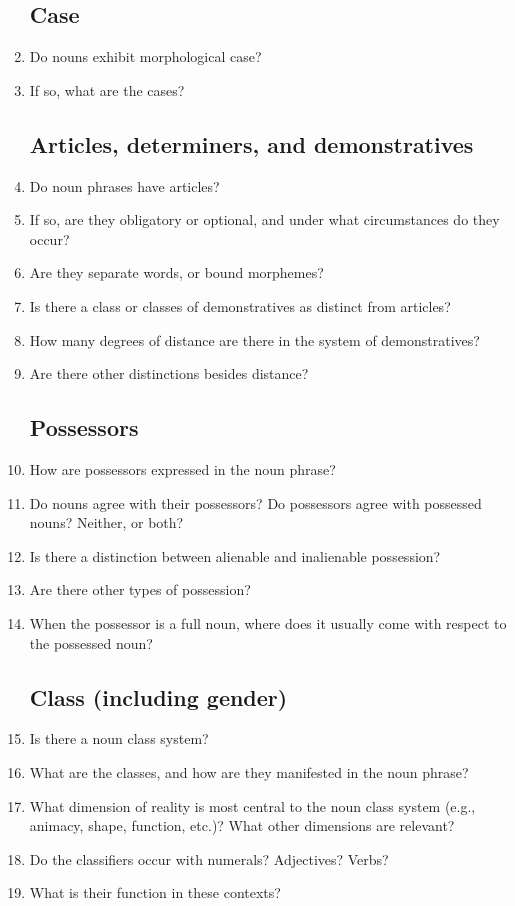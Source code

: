 \documentclass[twocolumn]{scrartcl}
\begin{document}
\begin{enumerate}[resume]
 \subsection{Case}
 \item Do nouns exhibit morphological case?
 \item If so, what are the cases? 
 \subsection{Articles, determiners, and demonstratives}
 \item Do noun phrases have articles?
 \item If so, are they obligatory or optional, and under what circumstances do they occur?
 \item Are they separate words, or bound morphemes?
 \item Is there a class or classes of demonstratives as distinct from articles?
 \item How many degrees of distance are there in the system of demonstratives?
 \item Are there other distinctions besides distance?
 \subsection{Possessors}
\item How are possessors expressed in the noun phrase?
\item Do nouns agree with their possessors?  Do possessors agree with possessed nouns? Neither, or both?
\item Is there a distinction between alienable and inalienable possession?
\item Are there other types of possession?
\item When the possessor is a full noun, where does it usually come with respect to the possessed noun?
\subsection{Class (including gender)}
\item Is there a noun class system?
\item What are the classes, and how are they manifested in the noun phrase?
\item What dimension of reality is most central to the noun class system (e.g., animacy, shape, function, etc.)? What other dimensions are relevant?
\item Do the classifiers occur with numerals? Adjectives? Verbs?
\item What is their function in these contexts?

\end{enumerate}
\end{document}
